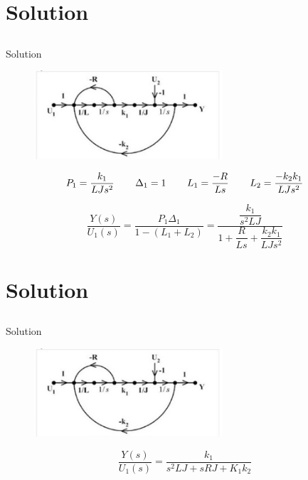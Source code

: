 \documentclass[10pt]{beamer}
\begin{document}
\section{Solution}
\subsection{}
\begin{frame}{Solution}
\begin{figure}
    \centering
    \includegraphics[width=7cm]{image.jpg}

\end{figure}
\begin{align}

P_1=\dfrac{k_1}{LJs^2} \hspace{0.75cm}
\Delta_1 =1 \hspace{0.75cm}
L_1=\dfrac{-R}{Ls}\hspace{0.75cm}
L_2=\dfrac{-k_2 k_1}{LJs^2}   

\end{align}

\[
\dfrac{Y(s)}{U_1(s)} = \dfrac{P_1 \Delta_1}{1-(L_1+L_2)}=\dfrac{\dfrac{k_1}{s^2LJ}}{1+\dfrac{R}{Ls}+\dfrac{k_2 k_1}{LJs^2}}
\]

\end{frame}

\section{Solution}
\subsection{}
\begin{frame}{Solution}
\begin{figure}
    \centering
    \includegraphics[width=7cm]{image.jpg}

\end{figure}
\centering
\[

 \dfrac{Y(s)}{U_1(s)}=\dfrac{k_1}{s^2LJ+sRJ+K_1k_2}

\]
\end{frame}
\end{document}
